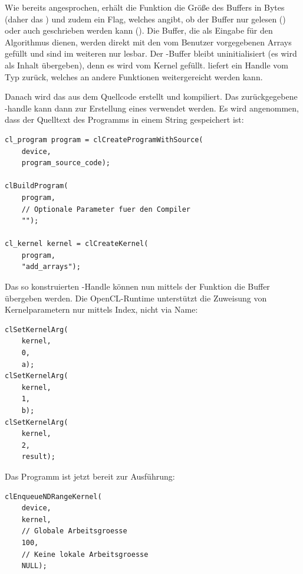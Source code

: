 Wie bereits angesprochen, erhält die Funktion 
die Größe des Buffers in Bytes (daher das ) und
zudem ein Flag, welches angibt, ob der Buffer nur gelesen
() oder auch geschrieben werden kann
(). Die Buffer, die als Eingabe für den
Algorithmus dienen, werden direkt mit den vom Benutzer vorgegebenen Arrays
gefüllt und sind im weiteren nur lesbar. Der -Buffer
bleibt uninitialisiert (es wird  als Inhalt übergeben),
denn es wird vom Kernel gefüllt.  liefert ein
Handle vom Typ  zurück, welches an andere Funktionen
weitergereicht werden kann.

Danach wird das  aus dem Quellcode erstellt
und kompiliert. Das zurückgegebene -handle kann
dann zur Erstellung eines  verwendet werden.
Es wird angenommen, dass der Quelltext des Programms in einem String
 gespeichert ist:

\begin{verbatim}
cl_program program = clCreateProgramWithSource(
    device,
    program_source_code);

clBuildProgram(
    program,
    // Optionale Parameter fuer den Compiler
    "");

cl_kernel kernel = clCreateKernel(
    program,
    "add_arrays");
\end{verbatim}

Das so konstruierten -Handle können nun mittels
der Funktion  die Buffer übergeben werden. Die
OpenCL-Runtime unterstützt die Zuweisung von Kernelparametern nur mittels Index,
nicht via Name:

\begin{verbatim}
clSetKernelArg(
    kernel,
    0,
    a);
clSetKernelArg(
    kernel,
    1,
    b);
clSetKernelArg(
    kernel,
    2,
    result);
\end{verbatim}

Das Programm ist jetzt bereit zur Ausführung:

\begin{verbatim}
clEnqueueNDRangeKernel(
    device,
    kernel,
    // Globale Arbeitsgroesse
    100,
    // Keine lokale Arbeitsgroesse
    NULL);
\end{verbatim}

